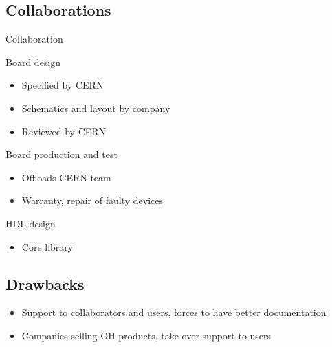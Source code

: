 \documentclass[compress,red]{beamer}
\begin{document}
\subsection{Collaborations}

\begin{frame}{Collaboration}

  \begin{block}{Board design}
    \begin{itemize}
    \item Specified by CERN
    \item Schematics and layout by company
    \item Reviewed by CERN
    \end{itemize}
  \end{block}

  \begin{block}{Board production and test}
    \begin{itemize}
    \item Offloads CERN team
    \item Warranty, repair of faulty devices
    \end{itemize}
  \end{block}

  \begin{block}{HDL design}
    \begin{itemize}
    \item Core library
    \end{itemize}
  \end{block}


\end{frame}

\subsection{Drawbacks}

\begin{frame}{}

  \begin{block}{}
    \begin{itemize}
    \item Support to collaborators and users, forces to have better documentation
    \item Companies selling OH products, take over support to users
    \end{itemize}
  \end{block}

\end{frame}
\end{document}
